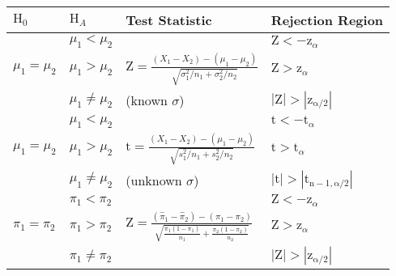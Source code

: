 \documentclass[10pt]{extarticle}
\begin{document}
\begin{center}
    \begin{tabular}{ | l | l | l | l | }
        \hline
        $\mathrm{H}_0$ & $\mathrm{H}_A$ & Test Statistic & Rejection Region \\ \hline

        & $\mu_1<\mu_2$ 
        & 
        & $\mathrm{Z}<-\mathrm{z}_\alpha$ \\
         
        $\mu_1=\mu_2$ 
        & $\mu_1>\mu_2$ 
        & $\mathrm{Z}=\frac{(X_1-X_2)-(\mu_1-\mu_2)}{\sqrt{\sigma_1^{2}/n_1+\sigma_2^{2}/n_2}}$ 
        & $\mathrm{Z}>\mathrm{z}_\alpha$ \\

        & $\mu_1\ne\mu_2$
        & (known $\sigma$)
        & $\mathrm{|Z|}>\mathrm{|z_{\alpha/2}|}$ \\ \hline\hline

        & $\mu_1<\mu_2$ 
        & 
        & $\mathrm{t}<-\mathrm{t}_\alpha$ \\
         
        $\mu_1=\mu_2$ 
        & $\mu_1>\mu_2$ 
        & $\mathrm{t}=\frac{(X_1-X_2)-(\mu_1-\mu_2)}{\sqrt{s_1^{2}/n_1+s_2^{2}/n_2}}$ 
        & $\mathrm{t}>\mathrm{t}_\alpha$ \\

        & $\mu_1\ne\mu_2$
        & (unknown $\sigma$)
        & $\mathrm{|t|}>\mathrm{|t_{n-1,\alpha/2}|}$ \\ \hline\hline

        & $\pi_1<\pi_2$ 
        & 
        & $\mathrm{Z}<-\mathrm{z}_\alpha$ \\
         
        $\pi_1=\pi_2$ 
        & $\pi_1>\pi_2$ 
        &
        $\mathrm{Z}=\frac{(\hat{\pi}_1-\hat{\pi}_2)-(\pi_1-\pi_2)}{\sqrt{\frac{\pi_{1}(1-\pi_1)}{n_1}+\frac{\pi_{2}(1-\pi_2)}{n_2}}}$ 
        & $\mathrm{Z}>\mathrm{z}_\alpha$ \\

        & $\pi_1\ne\pi_2$
        & 
        & $\mathrm{|Z|}>\mathrm{|z_{\alpha/2}|}$ \\ \hline








    \end{tabular}
\end{center}
\end{document}
